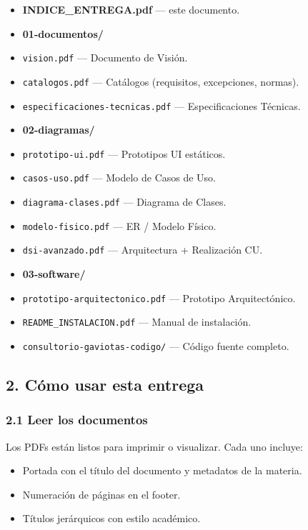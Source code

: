 \documentclass[11pt,letterpaper]{article}
\begin{document}
\begin{itemize}[leftmargin=*]
  \item \textbf{INDICE_ENTREGA.pdf} --- este documento.
  \item \textbf{01-documentos/}
  \item \texttt{vision.pdf} --- Documento de Visión.
  \item \texttt{catalogos.pdf} --- Catálogos (requisitos, excepciones, normas).
  \item \texttt{especificaciones-tecnicas.pdf} --- Especificaciones Técnicas.
  \item \textbf{02-diagramas/}
  \item \texttt{prototipo-ui.pdf} --- Prototipos UI estáticos.
  \item \texttt{casos-uso.pdf} --- Modelo de Casos de Uso.
  \item \texttt{diagrama-clases.pdf} --- Diagrama de Clases.
  \item \texttt{modelo-fisico.pdf} --- ER / Modelo Físico.
  \item \texttt{dsi-avanzado.pdf} --- Arquitectura + Realización CU.
  \item \textbf{03-software/}
  \item \texttt{prototipo-arquitectonico.pdf} --- Prototipo Arquitectónico.
  \item \texttt{README\_INSTALACION.pdf} --- Manual de instalación.
  \item \texttt{consultorio-gaviotas-codigo/} --- Código fuente completo.
\end{itemize}

\hrulefill

\subsection{2. Cómo usar esta entrega}

\subsubsection{2.1 Leer los documentos}

Los PDFs están listos para imprimir o visualizar. Cada uno incluye:
\begin{itemize}[leftmargin=*]
  \item Portada con el título del documento y metadatos de la materia.
  \item Numeración de páginas en el footer.
  \item Títulos jerárquicos con estilo académico.
\end{itemize}
\end{document}
